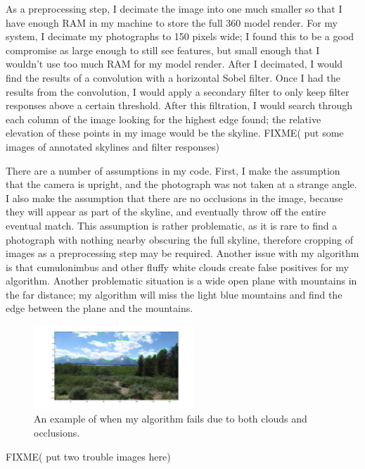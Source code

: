 \documentclass{acm_proc_article-sp}
\begin{document}
As a preprocessing step, I decimate the image into one much smaller so that I have enough RAM in my machine to store the full 360 model render.  For my system, I decimate my photographs to 150 pixels wide; I found this to be a good compromise as large enough to still see features, but small enough that I wouldn’t use too much RAM for my model render. After I decimated, I would find the results of a convolution with a horizontal Sobel filter. Once I had the results from the convolution, I would apply a secondary filter to only keep filter responses above a certain threshold.  After this filtration, I would search through each column of the image looking for the highest edge found; the relative elevation of these points in my image would be the skyline.  FIXME( put some images of annotated skylines and filter responses)

    There are a number of assumptions in my code.  First, I make the assumption that the camera is upright, and the photograph was not taken at a strange angle.  I also make the assumption that there are no occlusions in the image, because they will appear as part of the skyline, and eventually throw off the entire eventual match.  This assumption is rather problematic, as it is rare to find a photograph with nothing nearby obscuring the full skyline, therefore cropping of images as a preprocessing step may be required.  Another issue with my algorithm is that cumulonimbus and other fluffy white clouds create false positives for my algorithm.   Another problematic situation is a wide open plane with mountains in the far distance; my algorithm will miss the light blue mountains and find the edge between the plane and the mountains.  
\begin{figure}
	\centering
	\includegraphics[width=60mm]{tetonsCloudErrorSmallSkyline.png}
	\caption{An example of when my algorithm fails due to both clouds and occlusions.}
\end{figure}
FIXME( put two trouble images here)
\end{document}

